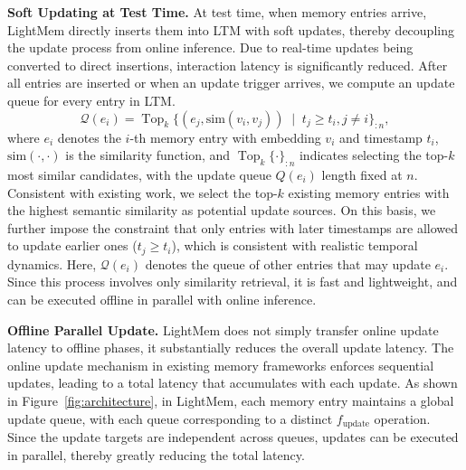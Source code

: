 \noindent \textbf{Soft Updating at Test Time.} 
At test time, when memory entries arrive, LightMem directly inserts them into LTM with soft updates, thereby decoupling the update process from online inference. 
Due to real-time updates being converted to direct insertions, interaction latency is significantly reduced. 
After all entries are inserted or when an update trigger arrives, we compute an update queue for every entry in LTM. 
\[
\mathcal{Q}(e_i) = \operatorname{Top}_{k}\Big\{ (e_j, \mathrm{sim}(v_i, v_j)) \;\mid\; t_j \geq t_i, j \neq i \Big\}_{:n},
\]
where $e_i$ denotes the $i$-th memory entry with embedding $v_i$ and timestamp $t_i$, $\mathrm{sim}(\cdot,\cdot)$ is the similarity function, and $\operatorname{Top}_{k}\{\cdot\}_{:n}$ indicates selecting the top-$k$ most similar candidates, with the update queue ${Q}(e_i)$ length fixed at $n$. 
Consistent with existing work, we select the top-$k$ existing memory entries with the highest semantic similarity as potential update sources. 
On this basis, we further impose the constraint that only entries with later timestamps are allowed to update earlier ones ($t_j \geq t_i$), which is consistent with realistic temporal dynamics. 
Here, $\mathcal{Q}(e_i)$ denotes the queue of other entries that may update $e_i$. 
Since this process involves only similarity retrieval, it is fast and lightweight, and can be executed offline in parallel with online inference. 

\noindent \textbf{Offline Parallel Update.}
LightMem does not simply transfer online update latency to offline phases, it substantially reduces the overall update latency. 
The online update mechanism in existing memory frameworks enforces sequential updates, leading to a total latency that accumulates with each update. 
As shown in Figure~\ref{fig:architecture}, in LightMem, each memory entry maintains a global update queue, with each queue corresponding to a distinct $f_{\text{update}}$ operation. 
Since the update targets are independent across queues, updates can be executed in parallel, thereby greatly reducing the total latency. 